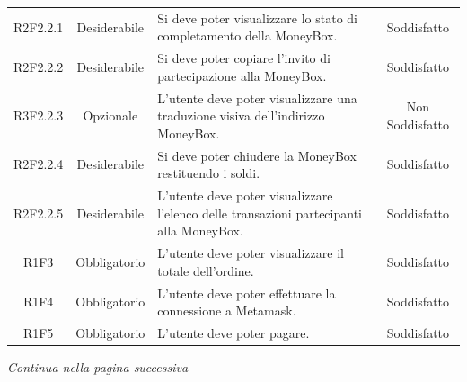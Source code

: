 \begin{table}[H]
\begin{tabular}{c | c | p{6cm} | c }
        R2F2.2.1                                                          & Desiderabile & Si deve poter visualizzare lo stato di completamento della MoneyBox\glo{}.                    & Soddisfatto                                 \\
        R2F2.2.2                                                          & Desiderabile & Si deve poter copiare l’invito di partecipazione alla MoneyBox\glo{}.                         & Soddisfatto                                 \\
        R3F2.2.3                                                          & Opzionale    & L'utente deve poter visualizzare una traduzione visiva dell'indirizzo MoneyBox\glo{}.         & Non Soddisfatto        \\
        R2F2.2.4                                                          & Desiderabile & Si deve poter chiudere la MoneyBox\glo{} restituendo i soldi.                                 & Soddisfatto                                  \\
        R2F2.2.5                                                          & Desiderabile & L'utente deve poter visualizzare l'elenco delle transazioni partecipanti alla MoneyBox\glo{}. & Soddisfatto \\
        R1F3                                                              & Obbligatorio & L'utente deve poter visualizzare il totale dell'ordine.                                       & Soddisfatto \\
        R1F4                                                              & Obbligatorio & L'utente deve poter effettuare la connessione a Metamask\glo{}.                               & Soddisfatto   \\
        R1F5                                                              & Obbligatorio & L'utente deve poter pagare.                                                                   & Soddisfatto \\
    \end{tabular}
\end{table}
\begin{center}
    \textit{\small Continua nella pagina successiva}
\end{center}
